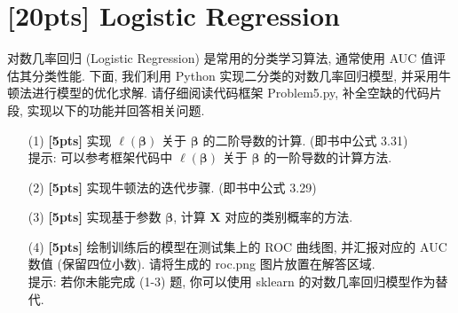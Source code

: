 \documentclass[a4paper,UTF8]{article}
\numberwithin{equation}{section}
\theoremstyle{definition}
\begin{document}
\newpage
\section{[20pts] Logistic Regression}
对数几率回归 (Logistic Regression) 是常用的分类学习算法, 通常使用 AUC 值评估其分类性能. 下面, 我们利用 Python 实现二分类的对数几率回归模型, 并采用牛顿法进行模型的优化求解. 请仔细阅读代码框架 Problem5.py, 补全空缺的代码片段, 实现以下的功能并回答相关问题.
\begin{enumerate}
    \item[(1)] \textbf{[5pts]} 实现 $\ell(\mathbf{\beta})$ 关于 $\mathbf{\beta}$ 的二阶导数的计算. (即书中公式 3.31)\\提示: 可以参考框架代码中 $\ell(\mathbf{\beta})$ 关于 $\mathbf{\beta}$ 的一阶导数的计算方法.
    \item[(2)] \textbf{[5pts]} 实现牛顿法的迭代步骤. (即书中公式 3.29)
    \item[(3)] \textbf{[5pts]} 实现基于参数 $\mathbf{\beta}$, 计算 $\mathbf{X}$ 对应的类别概率的方法.
    \item[(4)] \textbf{[5pts]} 绘制训练后的模型在测试集上的 ROC 曲线图, 并汇报对应的 AUC 数值 (保留四位小数). 请将生成的 roc.png 图片放置在解答区域.\\提示: 若你未能完成 (1-3) 题, 你可以使用 sklearn 的对数几率回归模型作为替代.
\end{enumerate}
\end{document}
